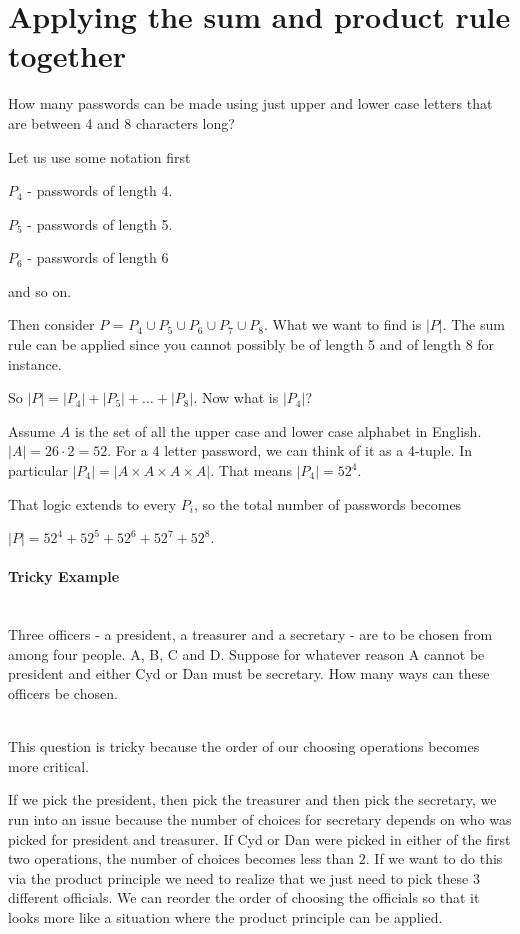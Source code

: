 \documentclass[12pt]{article}
\begin{document}
\section*{Applying the sum and product rule together}

How many passwords can be made using just upper and lower case letters that are between 4 and 8 characters long?

Let us use some notation first

$P_4$ - passwords of length 4.

$P_5$ - passwords of length 5.

$P_6$ - passwords of length 6

and so on.

Then consider $P$ = $P_4 \cup P_5 \cup P_6 \cup P_7 \cup P_8$. What we want to find is $|P|$. The sum rule can be applied since you cannot possibly be of length 5 and of length 8 for instance.

So $|P| = |P_4| + |P_5| + \ldots + |P_8|$. Now what is $|P_4|$?

Assume $A$ is the set of all the upper case and lower case alphabet in English. $|A| = 26 \cdot 2=52$. For a 4 letter password, we can think of it as a 4-tuple. In particular $|P_4| = |A \times A \times A \times A|$.
That means $|P_4| = 52^4$.

That logic extends to every $P_i$, so the total number of passwords becomes

$|P| = 52^4 + 52^5 + 52^6 + 52^7 + 52^8$.

\paragraph{Tricky Example}~\\

Three officers - a president, a treasurer and a secretary - are to be chosen from among four people. A, B, C and D. Suppose for whatever reason A cannot be president and either Cyd or Dan must be secretary. How many ways can these officers be chosen.

~\\
This question is tricky because the order of our choosing operations becomes more critical. 

If we pick the president, then pick the treasurer and then pick the secretary, we run into an issue because the number of choices for secretary depends on who was picked for president and treasurer. If Cyd or Dan were picked in either of the first two operations, the number of choices becomes less than 2. If we want to do this via the product principle we need to realize that we just need to pick these 3 different officials. We can reorder the order of choosing the officials so that it looks more like a situation where the product principle can be applied. 
\end{document}
